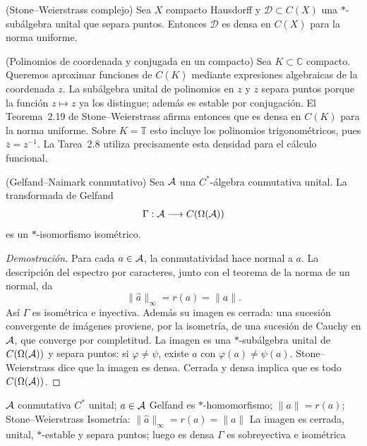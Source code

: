 \begin{cthteorema}{(Stone--Weierstrass complejo)}
Sea $X$ compacto Hausdorff y $\mathcal D\subset C(X)$ una $*$-subálgebra unital que separa puntos.
Entonces $\mathcal D$ es densa en $C(X)$ para la norma uniforme.
\end{cthteorema}

\begin{cthejemplo}{(Polinomios de coordenada y conjugada en un compacto)}
Sea $K\subset\mathbb C$ compacto. Queremos aproximar funciones de $C(K)$
mediante expresiones algebraicas de la coordenada $z$. La subálgebra unital
de polinomios en $z$ y $\overline z$ separa puntos porque la función
$z\mapsto z$ ya los distingue; además es estable por conjugación.
El Teorema~2.19 de Stone--Weierstrass afirma entonces que es densa en
$C(K)$ para la norma uniforme.
Sobre $K=\mathbb T$ esto incluye los polinomios trigonométricos, pues
$\overline z=z^{-1}$. La Tarea~2.8 utiliza precisamente esta densidad
para el cálculo funcional.
\end{cthejemplo}

\begin{cthteorema}{(Gelfand--Naimark conmutativo)}
Sea $\mathcal A$ una $C^*$-álgebra conmutativa unital. La transformada de Gelfand
\[
 \Gamma:\mathcal A\longrightarrow C(\Omega(\mathcal A))
\]
es un $*$-isomorfismo isométrico.
\end{cthteorema}

\begin{proof}[Demostración]
Para cada $a\in\mathcal A$, la conmutatividad hace normal a $a$. La descripción del
espectro por caracteres, junto con el teorema de la norma de un normal, da
\[
 \|\widehat a\|_\infty=r(a)=\|a\|.
\]
Así $\Gamma$ es isométrica e inyectiva. Además su imagen es cerrada: una
sucesión convergente de imágenes proviene, por la isometría, de una sucesión
de Cauchy en $\mathcal A$, que converge por completitud. La imagen es una
$*$-subálgebra unital de $C(\Omega(\mathcal A))$ y separa puntos: si $\varphi\neq\psi$, existe $a$ con
$\varphi(a)\neq\psi(a)$. Stone--Weierstrass dice que la imagen es densa. Cerrada y densa implica
que es todo $C(\Omega(\mathcal A))$.
\end{proof}

\proofdiagrambranch
{$\mathcal A$ conmutativa $C^*$ unital; $a\in\mathcal A$}
{Gelfand es $*$-homomorfismo; $\|a\|=r(a)$; Stone--Weierstrass}
{Isometría: $\|\widehat a\|_\infty=r(a)=\|a\|$}
{La imagen es cerrada, unital, $*$-estable y separa puntos; luego es densa}
{$\Gamma$ es sobreyectiva e isométrica}

